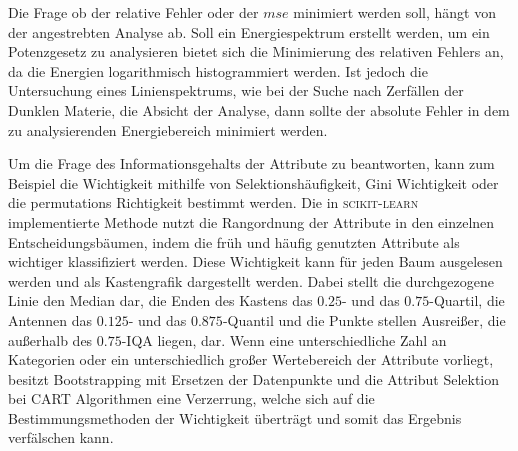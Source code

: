 Die Frage ob der relative Fehler oder der $mse$ minimiert werden soll, hängt von der angestrebten Analyse ab.
Soll ein Energiespektrum erstellt werden, um ein Potenzgesetz zu analysieren bietet sich die Minimierung des relativen Fehlers an, da die
Energien logarithmisch histogrammiert werden.
Ist jedoch die Untersuchung eines Linienspektrums, wie bei der Suche nach Zerfällen der Dunklen Materie, die Absicht der Analyse, dann sollte
der absolute Fehler in dem zu analysierenden Energiebereich minimiert werden. 


Um die Frage des Informationsgehalts der Attribute zu beantworten, kann zum Beispiel die Wichtigkeit mithilfe von Selektionshäufigkeit, Gini Wichtigkeit oder
die permutations Richtigkeit bestimmt werden.
Die in \textsc{scikit-learn} implementierte Methode nutzt die Rangordnung der Attribute in den einzelnen Entscheidungsbäumen, indem die früh und häufig genutzten Attribute
als wichtiger klassifiziert werden.
Diese Wichtigkeit kann für jeden Baum ausgelesen werden und als Kastengrafik dargestellt werden.
Dabei stellt die durchgezogene Linie den Median dar, die Enden des Kastens das $\num{0.25}$- und das $\num{0.75}$-Quartil, die Antennen das $\num{0.125}$- und das
$\num{0.875}$-Quantil und die Punkte stellen Ausreißer, die außerhalb des $\num{0.75}$-IQA liegen, dar.
Wenn eine unterschiedliche Zahl an Kategorien oder ein unterschiedlich großer Wertebereich der Attribute vorliegt, besitzt Bootstrapping mit Ersetzen der Datenpunkte
und die Attribut Selektion bei CART Algorithmen eine Verzerrung, welche sich auf die Bestimmungsmethoden der Wichtigkeit überträgt und somit das Ergebnis verfälschen
kann\cite{feature_importance}.
